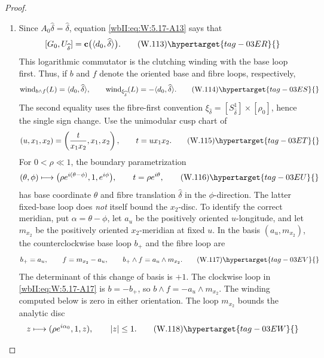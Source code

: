 \begin{proof}
\begin{enumerate}[label=\arabic*.,leftmargin=*]
\item Since
\(A_0\widehat\delta=\widehat\delta\), equation \eqref{wbII:eq:W:5.17-A13} says that
\[
 [G_0,U_{\widehat\delta}]
 =\mathbf c\bigl(\langle d_0,\widehat\delta\rangle\bigr).
\tag{W.113}\hypertarget{tag-03ER}{}\label{wbII:eq:W:5.17-A16}
\]
This logarithmic commutator is the clutching winding with the base loop
first.  Thus, if \(b\) and \(f\) denote the oriented base and fibre loops,
respectively,
\[
 \operatorname{wind}_{b\wedge f}(L)
  =\langle d_0,\widehat\delta\rangle,
 \qquad
 \operatorname{wind}_{\xi_{\widehat\delta}}(L)
 =-\langle d_0,\widehat\delta\rangle.
\tag{W.114}\hypertarget{tag-03ES}{}\label{wbII:eq:W:5.17-A17}
\]
The second equality uses the fibre-first convention
\(\xi_{\widehat\delta}=[S^1_{\widehat\delta}]\times[\rho_0]\), hence the
single sign change.
Use the unimodular cusp chart of 
\[
 (u,x_1,x_2)=\left(\frac{t}{x_1x_2},x_1,x_2\right),
 \qquad t=ux_1x_2.
\tag{W.115}\hypertarget{tag-03ET}{}\label{wbII:eq:W:5.17-A18}
\]
For \(0<\rho\ll1\), the boundary parametrization
\[
 (\theta,\phi)\longmapsto
 \bigl(\rho e^{i(\theta-\phi)},1,e^{i\phi}\bigr),
 \qquad t=\rho e^{i\theta},
\tag{W.116}\hypertarget{tag-03EU}{}\label{wbII:eq:W:5.17-A19}
\]
has base coordinate \(\theta\) and fibre translation
\(\widehat\delta\) in the \(\phi\)-direction.  The latter fixed-base loop
does \emph{not} itself bound the \(x_2\)-disc.  To identify the correct
meridian, put \(\alpha=\theta-\phi\), let \(a_u\) be the positively
oriented \(u\)-longitude, and let \(m_{x_2}\) be the positively oriented
\(x_2\)-meridian at fixed \(u\).  In the basis
$ (a_u,m_{x_2}) $, the counterclockwise base loop $b_+$ and the fibre loop are
\[
 b_+=a_u,
 \qquad
 f=m_{x_2}-a_u,
 \qquad
 b_+\wedge f=a_u\wedge m_{x_2}.
\tag{W.117}\hypertarget{tag-03EV}{}\label{wbII:eq:W:5.17-A19a}
\]
The determinant of this change of basis is $+1$.  The clockwise loop in
\eqref{wbII:eq:W:5.17-A17} is $b=-b_+$, so
$b\wedge f=-a_u\wedge m_{x_2}$.  The winding computed below is zero
in either orientation.  The loop $m_{x_2}$ bounds the
analytic disc
\[
 z\longmapsto(\rho e^{i\alpha_0},1,z),
 \qquad |z|\le1.
\tag{W.118}\hypertarget{tag-03EW}{}\label{wbII:eq:W:5.17-A19b}
\]


\end{enumerate}
\end{proof}

